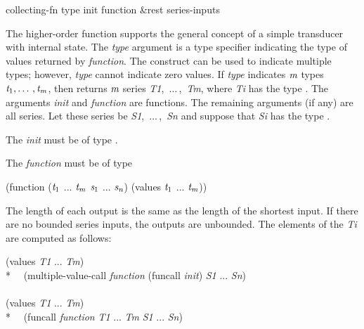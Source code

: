 \begin{defun}[Function]
collecting-fn type init function &rest series-inputs

The higher-order function  supports the general concept of
a simple transducer with internal state.  The \emph{type} argument is a type
specifier indicating the type of values returned by \emph{function}.
The  construct can be used to indicate multiple types; however,
\emph{type} cannot indicate zero values.  If \emph{type} indicates $\emph{m}$ types
$\emph{t}_1, \ldots\,, \emph{t}_{\hbox{\scriptsize\it m}}$,
then  returns $\emph{m}$ series {\it
T1},~$\ldots\,$,~\emph{Tm}, where \emph{Ti} has the
type .  The
arguments \emph{init} and \emph{function} are functions.  The remaining
arguments (if any) are all series.  Let these series be {\it
S1},~$\ldots\,$,~\emph{Sn} and suppose that \emph{Si} has the type
.

The \emph{init} must be of type 
.

The \emph{function} must be of type
\begin{lisp}
(function ($\emph{t}_1$ ... $\emph{t}_{\hbox{\scriptsize\it m}}$ $\emph{s}_1$ ... $\emph{s}_{\hbox{\scriptsize\it n}}$) (values $\emph{t}_1$ ... $\emph{t}_{\hbox{\scriptsize\it m}}$))
\end{lisp}

The length of each output is the same as the length of the shortest input.
If there are no bounded series inputs, the outputs are unbounded.
The elements of the \emph{Ti} are computed as follows:
\begin{lisp}
(values \emph{T1} ... \emph{Tm}) {\EQ} \\*
~~(multiple-value-call \emph{function} (funcall  \emph{init}) \emph{S1} ... \emph{Sn}) \\
\\
(values \emph{T1} ... \emph{Tm}) {\EQ} \\*
~~(funcall \emph{function} \emph{T1} ... \emph{Tm} \emph{S1} ... \emph{Sn}) 
\end{lisp}


\end{defun}
